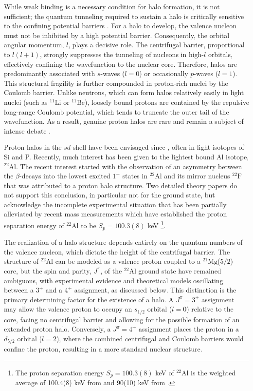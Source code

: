 \documentclass[

reprint,

superscriptaddress,









amsmath,amssymb,
aps,






floatfix,
prl
]{revtex4-2}
\begin{document}
While weak binding is a necessary condition for halo formation, it is not sufficient; the quantum tunneling required to sustain a halo is critically sensitive to the confining potential barriers \cite{Rii94,Jen04}.
For a halo to develop, the valence nucleon must not be inhibited by a high potential barrier.
Consequently, the orbital angular momentum, $l$, plays a decisive role.
The centrifugal barrier, proportional to $l(l+1)$, strongly suppresses the tunneling of nucleons in high-$l$ orbitals, effectively confining the wavefunction to the nuclear core.
Therefore, halos are predominantly associated with $s$-waves ($l=0$) or occasionally $p$-waves ($l=1$).
This structural fragility is further compounded in proton-rich nuclei by the Coulomb barrier.
Unlike neutrons, which can form halos relatively easily in light nuclei (such as $^{11}\text{Li}$ or $^{11}\text{Be}$), loosely bound protons are contained by the repulsive long-range Coulomb potential, which tends to truncate the outer tail of the wavefunction.
As a result, genuine proton halos are rare and remain a subject of intense debate \cite{Tan96,Jon04,Leh22,Zha24,Zha25}.

Proton halos in the $sd$-shell have been envisaged since \cite{Bro96}, often in light isotopes of Si and P.
Recently, much interest has been given to the lightest bound Al isotope, $^{22}\mathrm{Al}$.
The recent interest started with the observation \cite{Lee20} of an asymmetry between the $\beta$-decays into the lowest excited $1^+$ states in $^{22}\mathrm{Al}$ and its mirror nucleus $^{22}\mathrm{F}$ that was attributed to a proton halo structure.
Two detailed theory papers \cite{Zha24,Pap25} do not support this conclusion, in particular not for the ground state, but acknowledge the incomplete experimental situation that has been partially alleviated by recent mass measurements \cite{Cam24,Sun24} which have established the proton separation energy of $^{22}\mathrm{Al}$ to be $S_p = 100.3(8)$ keV
\footnote{The proton separation energy $S_p = 100.3(8)$ keV of $^{22}\mathrm{Al}$ is the weighted average of 100.4(8) keV from \cite{Cam24} and 90(10) keV from \cite{Sun24}.}.

The realization of a halo structure depends entirely on the quantum numbers of the valence nucleon, which dictate the height of the centrifugal barrier.
The structure of $^{22}\text{Al}$ can be modeled as a valence proton coupled to a $^{21}\text{Mg}$($5/2$) core, but the spin and parity, $J^\pi$, of the $^{22}\text{Al}$ ground state have remained ambiguous, with experimental evidence and theoretical models oscillating between a $3^+$ and a $4^+$ assignment, as discussed below.
This distinction is the primary determining factor for the existence of a halo.
A $J^\pi = 3^+$ assignment may allow the valence proton to occupy an $s_{1/2}$ orbital ($l=0$) relative to the core, facing no centrifugal barrier and allowing for the possible formation of an extended proton halo.
Conversely, a $J^\pi = 4^+$ assignment places the proton in a $d_{5/2}$ orbital ($l=2$), where the combined centrifugal and Coulomb barriers would confine the proton, resulting in a more standard nuclear structure.
\end{document}
